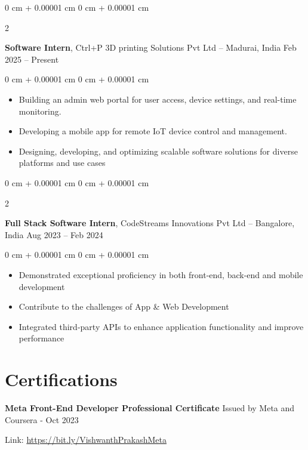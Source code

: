 \documentclass[10pt, letterpaper]{article}
\newenvironment{highlights}{
    \begin{itemize}[
        topsep=0.10 cm,
        parsep=0.10 cm,
        partopsep=0pt,
        itemsep=0pt,
        leftmargin=0 cm + 10pt
    ]
}{
    \end{itemize}
} %
\newenvironment{onecolentry}{
    \begin{adjustwidth}{
        0 cm + 0.00001 cm
    }{
        0 cm + 0.00001 cm
    }
}{
    \end{adjustwidth}
} %
\newenvironment{twocolentry}[2][]{
    \onecolentry
    \def\secondColumn{#2}
    \setcolumnwidth{\fill, 4.5 cm}
    \begin{paracol}{2}
}{
    \switchcolumn \raggedleft \secondColumn
    \end{paracol}
    \endonecolentry
} %
\begin{document}
     \begin{twocolentry}{
            Feb 2025 – Present
        }
            \textbf{Software Intern}, Ctrl+P 3D printing Solutions Pvt Ltd – Madurai, India  \end{twocolentry}

        \vspace{0.10 cm}
        \begin{onecolentry}
            \begin{highlights}
                \item Building an admin web portal for user access, device settings, and real-time monitoring.  
                \item Developing a mobile app for remote IoT device control and management. 
                \item  Designing, developing, and optimizing scalable software solutions for diverse platforms and use cases 
            \end{highlights}
        \end{onecolentry}

        \vspace{0.4 cm}
        
        \begin{twocolentry}{
            Aug 2023 – Feb 2024
        }
            \textbf{Full Stack Software Intern}, CodeStreams Innovations Pvt Ltd – Bangalore, India  \end{twocolentry}

        \vspace{0.10 cm}
        \begin{onecolentry}
            \begin{highlights}
                \item Demonstrated exceptional proficiency in both front-end, back-end and mobile development 
                \item Contribute to the challenges of App \& Web Development 
                \item Integrated third-party APIs to enhance application functionality and improve performance 
            \end{highlights}
        \end{onecolentry}

         \section{Certifications}
       
       \begin{samepage}
    \noindent
    \textbf{Meta Front-End Developer Professional Certificate} 
    \hfill 
    Issued by Meta and Coursera - Oct 2023
    
    \vspace{0.03 cm}
    
    \noindent
    Link: \href{https://bit.ly/VishwanthPrakashMeta}{https://bit.ly/VishwanthPrakashMeta}
\end{samepage}
\end{document}
